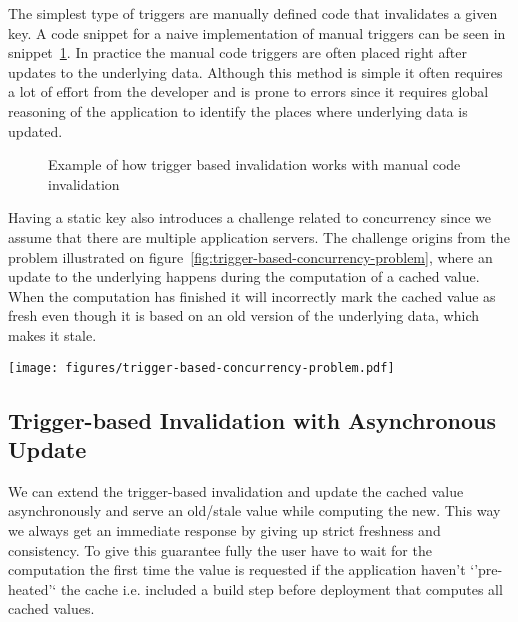The simplest type of triggers are manually defined code that invalidates a given key. A code snippet for a naive implementation of manual triggers can be seen in snippet~\ref{code:manual-trigger-invalidation}. In practice the manual code triggers are often placed right after updates to the underlying data. Although this method is simple it often requires a lot of effort from the developer and is prone to errors since it requires global reasoning of the application to identify the places where underlying data is updated.

\begin{figure}

\caption{Example of how trigger based invalidation works with manual code invalidation}
\label{code:manual-trigger-invalidation}
\end{figure}


Having a static key also introduces a challenge related to concurrency since we assume that there are multiple application servers. The challenge origins from the problem illustrated on figure~\ref{fig:trigger-based-concurrency-problem}, where an update to the underlying happens during the computation of a cached value. When the computation has finished it will incorrectly mark the cached value as fresh even though it is based on an old version of the underlying data, which makes it stale.

\begin{figure*}[ht!]
  \centering
  \texttt{[image: figures/trigger-based-concurrency-problem.pdf]}
  \caption{A scenario of the trigger-based invalidation that results in a race condition, where the cached value are being incorrectly marked as valid even though it is storing a stale value.}
  \label{fig:trigger-based-concurrency-problem}
\end{figure*}


\subsection{Trigger-based Invalidation with Asynchronous Update}
\label{subsec:trigger-based-invalidation-with-asynchronous-update}

We can extend the trigger-based invalidation and update the cached value asynchronously and serve an old/stale value while computing the new. This way we always get an immediate response by giving up strict freshness and consistency. To give this guarantee fully the user have to wait for the computation the first time the value is requested if the application haven't `'pre-heated'` the cache i.e. included a build step before deployment that computes all cached values.

